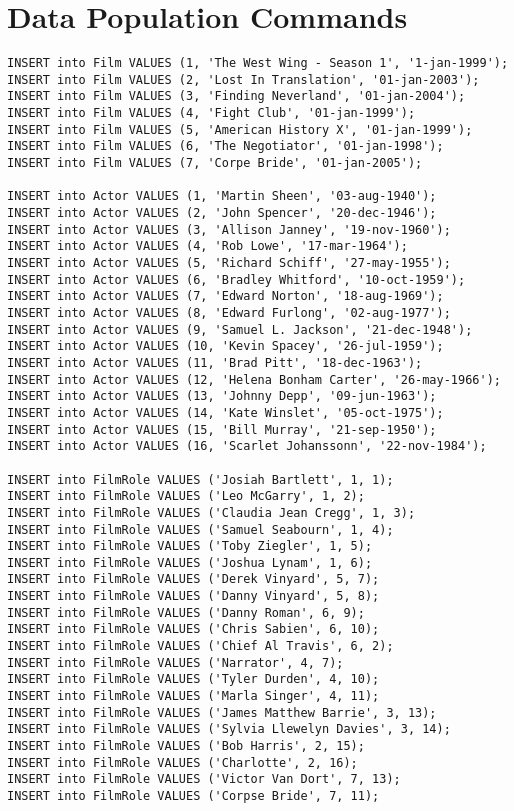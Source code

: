 \documentclass[a4paper,12pt]{article}
\begin{document}
\section{Data Population Commands}

\begin{verbatim}
INSERT into Film VALUES (1, 'The West Wing - Season 1', '1-jan-1999');
INSERT into Film VALUES (2, 'Lost In Translation', '01-jan-2003');
INSERT into Film VALUES (3, 'Finding Neverland', '01-jan-2004');
INSERT into Film VALUES (4, 'Fight Club', '01-jan-1999');
INSERT into Film VALUES (5, 'American History X', '01-jan-1999');
INSERT into Film VALUES (6, 'The Negotiator', '01-jan-1998');
INSERT into Film VALUES (7, 'Corpe Bride', '01-jan-2005');

INSERT into Actor VALUES (1, 'Martin Sheen', '03-aug-1940');
INSERT into Actor VALUES (2, 'John Spencer', '20-dec-1946');
INSERT into Actor VALUES (3, 'Allison Janney', '19-nov-1960');
INSERT into Actor VALUES (4, 'Rob Lowe', '17-mar-1964');
INSERT into Actor VALUES (5, 'Richard Schiff', '27-may-1955');
INSERT into Actor VALUES (6, 'Bradley Whitford', '10-oct-1959');
INSERT into Actor VALUES (7, 'Edward Norton', '18-aug-1969');
INSERT into Actor VALUES (8, 'Edward Furlong', '02-aug-1977');
INSERT into Actor VALUES (9, 'Samuel L. Jackson', '21-dec-1948');
INSERT into Actor VALUES (10, 'Kevin Spacey', '26-jul-1959');
INSERT into Actor VALUES (11, 'Brad Pitt', '18-dec-1963');
INSERT into Actor VALUES (12, 'Helena Bonham Carter', '26-may-1966');
INSERT into Actor VALUES (13, 'Johnny Depp', '09-jun-1963');
INSERT into Actor VALUES (14, 'Kate Winslet', '05-oct-1975');
INSERT into Actor VALUES (15, 'Bill Murray', '21-sep-1950');
INSERT into Actor VALUES (16, 'Scarlet Johanssonn', '22-nov-1984');

INSERT into FilmRole VALUES ('Josiah Bartlett', 1, 1);
INSERT into FilmRole VALUES ('Leo McGarry', 1, 2);
INSERT into FilmRole VALUES ('Claudia Jean Cregg', 1, 3);
INSERT into FilmRole VALUES ('Samuel Seabourn', 1, 4);
INSERT into FilmRole VALUES ('Toby Ziegler', 1, 5);
INSERT into FilmRole VALUES ('Joshua Lynam', 1, 6);
INSERT into FilmRole VALUES ('Derek Vinyard', 5, 7);
INSERT into FilmRole VALUES ('Danny Vinyard', 5, 8);
INSERT into FilmRole VALUES ('Danny Roman', 6, 9);
INSERT into FilmRole VALUES ('Chris Sabien', 6, 10);
INSERT into FilmRole VALUES ('Chief Al Travis', 6, 2);
INSERT into FilmRole VALUES ('Narrator', 4, 7);
INSERT into FilmRole VALUES ('Tyler Durden', 4, 10);
INSERT into FilmRole VALUES ('Marla Singer', 4, 11);
INSERT into FilmRole VALUES ('James Matthew Barrie', 3, 13);
INSERT into FilmRole VALUES ('Sylvia Llewelyn Davies', 3, 14);
INSERT into FilmRole VALUES ('Bob Harris', 2, 15);
INSERT into FilmRole VALUES ('Charlotte', 2, 16);
INSERT into FilmRole VALUES ('Victor Van Dort', 7, 13);
INSERT into FilmRole VALUES ('Corpse Bride', 7, 11);


\end{verbatim}
\end{document}
